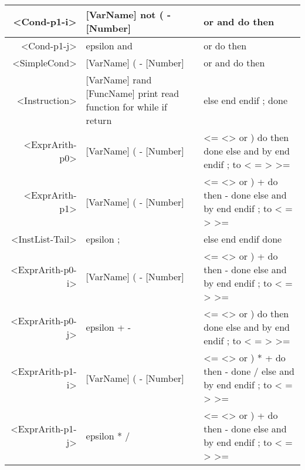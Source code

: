 \begin{longtable}{r p{7cm} p{7cm}}
<Cond-p1-i> & [VarName] not ( - [Number]  & or and do then \\ \hline
<Cond-p1-j> & epsilon and  & or do then \\ \hline
<SimpleCond> & [VarName] ( - [Number]  & or and do then \\ \hline
<Instruction> & [VarName] rand [FuncName] print read function for while if return  & else end endif ; done \\ \hline
<ExprArith-p0> & [VarName] ( - [Number]  & <= <> or ) do then done else and by end endif ; to < = > >= \\ \hline
<ExprArith-p1> & [VarName] ( - [Number]  & <= <> or ) + do then - done else and by end endif ; to < = > >= \\ \hline
<InstList-Tail> & epsilon ;  & else end endif done \\ \hline
<ExprArith-p0-i> & [VarName] ( - [Number]  & <= <> or ) + do then - done else and by end endif ; to < = > >= \\ \hline
<ExprArith-p0-j> & epsilon + -  & <= <> or ) do then done else and by end endif ; to < = > >= \\ \hline
<ExprArith-p1-i> & [VarName] ( - [Number]  & <= <> or ) * + do then - done / else and by end endif ; to < = > >= \\ \hline
<ExprArith-p1-j> & epsilon * /  & <= <> or ) + do then - done else and by end endif ; to < = > >= 
\end{longtable}

